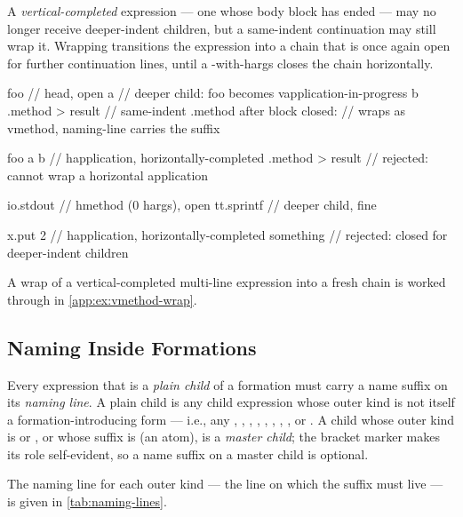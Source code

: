 A \emph{vertical-completed} expression --- one whose body block has ended ---
  may no longer receive deeper-indent children, but a same-indent
   continuation may still wrap it.
Wrapping transitions the expression into a  chain that is once
  again open for further continuation lines, until a -with-hargs
  closes the chain horizontally.

\begin{ffcode}
foo                  // head, open
  a                  //   deeper child: foo becomes vapplication-in-progress
  b
.method > result     // same-indent .method after block closed:
                     // wraps as vmethod, naming-line carries the suffix

foo a b              // happlication, horizontally-completed
.method > result     // rejected: cannot wrap a horizontal application

io.stdout            // hmethod (0 hargs), open
  tt.sprintf         //   deeper child, fine

x.put 2              // happlication, horizontally-completed
  something          // rejected: closed for deeper-indent children
\end{ffcode}

A wrap of a vertical-completed multi-line expression into a fresh
   chain is worked through in
  \cref{app:ex:vmethod-wrap}.

\subsection{Naming Inside Formations}\label{sec:wf:naming}

Every expression that is a \emph{plain child} of a formation must carry a
  name suffix on its \emph{naming line}.
A plain child is any child expression whose outer kind is not itself a
  formation-introducing form
  --- i.e., any , , ,
  , , ,
  , , or .
A child whose outer kind is  or
  , or whose suffix is  (an atom),
  is a \emph{master child}; the bracket marker makes its role self-evident,
  so a name suffix on a master child is optional.

The naming line for each outer kind --- the line on which the suffix must
  live --- is given in \cref{tab:naming-lines}.

